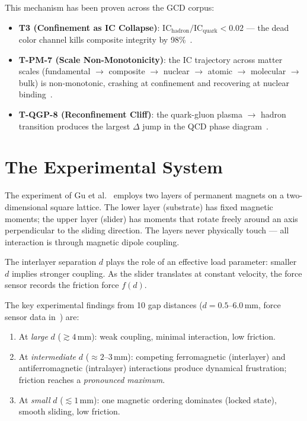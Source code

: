 \documentclass[
  aps,
  prd,
  twocolumn,
  superscriptaddress,
  nofootinbib,
  floatfix
]{revtex4-2}
\newcommand{\IC}{\mathrm{IC}}
\begin{document}
This mechanism has been proven across the GCD corpus:
\begin{itemize}[nosep]
  \item \textbf{T3 (Confinement as IC Collapse)}:
    $\IC_{\mathrm{hadron}} / \IC_{\mathrm{quark}} < 0.02$
    --- the dead color channel kills composite
    integrity by 98\%~\cite{paulus2025physicscoherence}.
  \item \textbf{T-PM-7 (Scale Non-Monotonicity)}:
    the $\IC$ trajectory across matter scales
    (fundamental $\to$ composite $\to$ nuclear $\to$
    atomic $\to$ molecular $\to$ bulk) is non-monotonic,
    crashing at confinement and recovering at nuclear
    binding~\cite{paulus2025physicscoherence}.
  \item \textbf{T-QGP-8 (Reconfinement Cliff)}:
    the quark-gluon plasma $\to$ hadron transition
    produces the largest $\Delta$ jump in the
    QCD phase diagram~\cite{paulus2026spacetimememory}.
\end{itemize}

\section{The Experimental System}\label{sec:experiment}

The experiment of Gu et al.~\cite{gu2026magnetic} employs
two layers of permanent magnets on a two-dimensional
square lattice.  The lower layer (substrate) has fixed
magnetic moments; the upper layer (slider) has moments
that rotate freely around an axis perpendicular to the
sliding direction.  The layers never physically touch
--- all interaction is through magnetic dipole coupling.

The interlayer separation $d$ plays the role of an
effective load parameter: smaller $d$ implies stronger
coupling.  As the slider translates at constant velocity,
the force sensor records the friction force $f(d)$.

The key experimental findings from 10 gap distances
($d = 0.5$--$6.0$\,mm, force sensor data in~\cite{gu2026data})
are:

\begin{enumerate}[nosep]
  \item At \emph{large} $d$ ($\gtrsim 4$\,mm): weak coupling,
    minimal interaction, low friction.
  \item At \emph{intermediate} $d$ ($\approx 2$--$3$\,mm):
    competing ferromagnetic (interlayer) and
    antiferromagnetic (intralayer) interactions produce
    dynamical frustration; friction reaches a
    \emph{pronounced maximum}.
  \item At \emph{small} $d$ ($\lesssim 1$\,mm): one
    magnetic ordering dominates (locked state), smooth
    sliding, low friction.
\end{enumerate}
\end{document}
